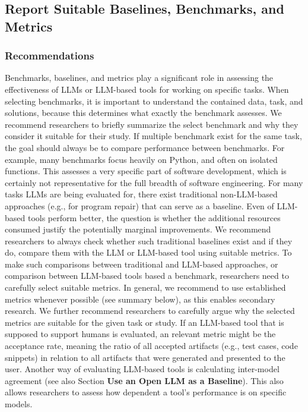 \documentclass[11pt]{article}
\begin{document}
\subsection{Report Suitable Baselines, Benchmarks, and Metrics}

\subsubsection{Recommendations}

Benchmarks, baselines, and metrics play a significant role in assessing the effectiveness of LLMs or LLM-based tools for working on specific tasks.
When selecting benchmarks, it is important to understand the contained data, task, and solutions, because this determines what exactly the benchmark assesses.
We recommend researchers to briefly summarize the select benchmark and why they consider it suitable for their study.
If multiple benchmark exist for the same task, the goal should always be to compare performance between benchmarks.
For example, many benchmarks focus heavily on Python, and often on isolated functions. This assesses a very specific part of software development, which is certainly not representative for the full breadth of software engineering.
For many tasks LLMs are being evaluated for, there exist traditional non-LLM-based approaches (e.g., for program repair) that can serve as a baseline. Even of LLM-based tools perform better, the question is whether the additional resources consumed justify the potentially marginal improvements.
We recommend researchers to always check whether such traditional baselines exist and if they do, compare them with the LLM or LLM-based tool using suitable metrics.
To make such comparisons between traditional and LLM-based approaches, or comparison between LLM-based tools based a benchmark, researchers need to carefully select suitable metrics.
In general, we recommend to use established metrics whenever possible (see summary below), as this enables secondary research.
We further recommend researchers to carefully argue why the selected metrics are suitable for the given task or study. 
If an LLM-based tool that is supposed to support humans is evaluated, an relevant metric might be the acceptance rate, meaning the ratio of all accepted artifacts (e.g., test cases, code snippets) in relation to all artifacts that were generated and presented to the user.
Another way of evaluating LLM-based tools is calculating inter-model agreement (see also Section \textbf{Use an Open LLM as a Baseline}).
This also allows researchers to assess how dependent a tool's performance is on specific models.
\end{document}
